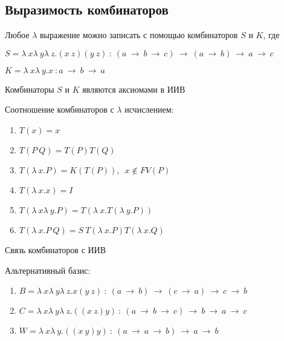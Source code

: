 	 \subsection{Выразимость комбинаторов}
	 \begin{statement}Любое $\lambda$ выражение можно записать с помощью комбинаторов $S$ и $K$, где\end{statement}
	 $S=\lambda\:x\lambda\:y\lambda\:z.(x\:z)(y\:z)\: : \:(a\:\rightarrow\:b\:\rightarrow\:c)\:\rightarrow\:(a\:\rightarrow\:b)\:\rightarrow\:a\:\rightarrow\:c$\par 
	 $K=\lambda\:x\lambda\:y.x\: : a\:\rightarrow\:b\:\rightarrow\:a$\par 
	 \begin{statement}Комбинаторы $S$ и $K$ являются аксиомами в ИИВ\end{statement}
	\begin{statement}Соотношение комбинаторов с $\lambda$ исчислением:\end{statement}
	\begin{enumerate}
		\item $T(x)=x$
		\item $T(P\:Q)=T(P)T(Q)$
		\item $T(\lambda\:x.P)=K(T(P)),\enspace x\not\in FV(P)$
		\item $T(\lambda\:x.x)=I$
		\item $T(\lambda\:x\lambda\:y.P)=T(\lambda\:x.T(\lambda\:y.P))$
		\item $T(\lambda\:x.P\:Q)=S\:T(\lambda\:x.P)T(\lambda\:x.Q)$
	\end{enumerate}		
	\begin{statement}Связь комбинаторов с ИИВ\end{statement}	
	\begin{statement}Альтернативный базис:\end{statement}
	 \begin{enumerate}
		\item $B=\lambda\:x\lambda\:y\lambda\:z.x(y\:z)\: : \:(a\:\rightarrow\:b)\:\rightarrow\:(c\:\rightarrow\:a)\:\rightarrow\:c\:\rightarrow\:b$
		\item $C=\lambda\:x\lambda\:y\lambda\:z.((x\:z)y)\: : \:(a\:\rightarrow\:b\:\rightarrow\:c)\:\rightarrow\:b\:\rightarrow\:a\:\rightarrow\:c$
		\item $W=\lambda\:x\lambda\:y.((x\:y)y)\: : \: (a\:\rightarrow\:a\:\rightarrow\:b)\:\rightarrow\:a\:\rightarrow\:b$
	 \end{enumerate}
